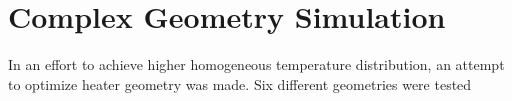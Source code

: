 \chapter{Complex Geometry Simulation }
\label{chap:Complex}

In an effort to achieve higher homogeneous temperature distribution, an attempt to optimize heater geometry was made. Six different geometries were tested 